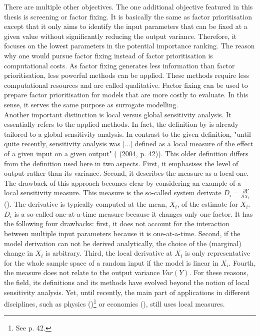 There are multiple other objectives. The one additional objective featured in this thesis is screening or factor fixing. It is basically the same as factor prioritisation except that it only aims to identify the input parameters that can be fixed at a given value without significantly reducing the output variance. Therefore, it focuses on the lowest parameters in the potential importance ranking. The reason why one would pursue factor fixing instead of factor prioritisation is computational costs. As factor fixing generates less information than factor prioritisation, less powerful methods can be applied. These methods require less computational resources and are called qualitative. Factor fixing can be used to prepare factor prioritisation for models that are more costly to evaluate. In this sense, it serves the same purpose as surrogate modelling.\\

\noindent
Another important distinction is local versus global sensitivity analysis. It essentially refers to the applied methods. In fact, the definition by \cite{Saltelli.2004} is already tailored to a global sensitivity analysis. In contrast to the given definition, "until quite recently, sensitivity analysis was [...] defined as a local measure of the effect of a given input on a given output" (\citeauthor{Saltelli.2004} (2004, p. 42)). This older definition differs from the definition used here in two aspects. First, it emphasises the level of output rather than its variance. Second, it describes the measure as a local one. The drawback of this approach becomes clear by considering an example of a local sensitivity measure. This measure is the so-called system derivate $D_i = \frac{\partial Y}{\partial X_i}$ (\cite{rabitz1989systems}). The derivative is typically computed at the mean, $\overline{X_i}$, of the estimate for $X_i$. $D_i$ is a so-called one-at-a-time measure because it changes only one factor. It has the following four drawbacks: first, it does not account for the interaction between multiple input parameters because it is one-at-a-time. Second, if the model derivation can not be derived analytically, the choice of the (marginal) change in $X_i$ is arbitrary. Third, the local derivative at $\overline{X_i}$ is only representative for the whole sample space of a random input if the model is linear in $X_i$. Fourth, the measure does not relate to the output variance $Var(Y)$. For these reasons, the field, its definitions and its methods have evolved beyond the notion of local sensitivity analysis. Yet, until recently, the main part of applications in different disciplines, such as physics (\cite{Saltelli.2004})\footnote{See p. 42.} or economics (\cite{Harenberg.2019}), still uses local measures.


